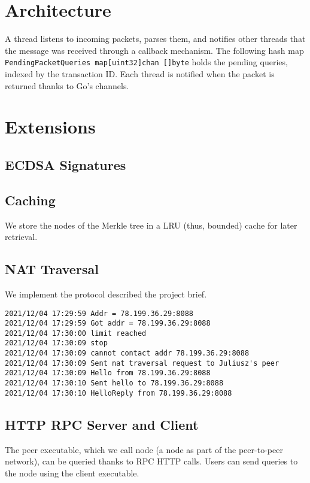 \documentclass[12pt,a4paper]{article}
\begin{document}
\section{Architecture}
A thread listens to incoming packets, parses them, and notifies other threads that the message was received through a callback mechanism. The following hash map \texttt{PendingPacketQueries map[uint32]chan []byte} holds the pending queries, indexed by the transaction ID. Each thread is notified when the packet is returned thanks to Go's channels.

\section{Extensions}


\subsection{ECDSA Signatures}

\subsection{Caching}
We store the nodes of the Merkle tree in a LRU (thus, bounded) cache for later retrieval.

\subsection{NAT Traversal}
We implement the protocol described the project brief. %

\begin{Verbatim}[breaklines=true, breakanywhere=true]
2021/12/04 17:29:59 Addr = 78.199.36.29:8088
2021/12/04 17:29:59 Got addr = 78.199.36.29:8088
2021/12/04 17:30:00 limit reached
2021/12/04 17:30:09 stop
2021/12/04 17:30:09 cannot contact addr 78.199.36.29:8088
2021/12/04 17:30:09 Sent nat traversal request to Juliusz's peer
2021/12/04 17:30:09 Hello from 78.199.36.29:8088
2021/12/04 17:30:10 Sent hello to 78.199.36.29:8088
2021/12/04 17:30:10 HelloReply from 78.199.36.29:8088
\end{Verbatim}

        
\subsection{HTTP RPC Server and Client}\label{RPC}
The peer executable, which we call node (a node as part of the peer-to-peer network), can be queried thanks to RPC HTTP calls. Users can send queries to the node using the client executable.
\end{document}
